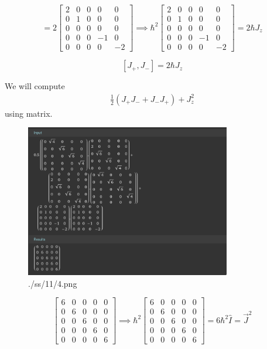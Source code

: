 \documentclass[letter, 10pts]{article}
\newcommand{\hb}{\hbar}
\begin{document}
\[
= 2 
\begin{bmatrix} 2&0&0&0&0\\
0&1&0&0&0\\
0&0&0&0&0\\
0&0&0&-1&0\\
0&0&0&0&-2\end{bmatrix}  
\implies \hb^2
\begin{bmatrix} 2&0&0&0&0\\
0&1&0&0&0\\
0&0&0&0&0\\
0&0&0&-1&0\\
0&0&0&0&-2\end{bmatrix}   = 2 \hb J_z
\] 

\[
	[J_+,J_-] = 2 \hb J_z
\] 

\newpage 
We will compute 
\begin{align*}
	\frac{1}{2}(
	J_+ J_- + J_- J_+ ) + J_z^2
\end{align*}
using matrix. 
\begin{figure}[H]
	\centering
	\includegraphics[width=0.8\textwidth]{./ss/11/4.png}
	\caption{./ss/11/4.png}
	\label{fig:-ss-11-4-png}
\end{figure}
\[
\begin{bmatrix} 
6 & 0 & 0 & 0 & 0 \\
0 & 6 & 0 & 0 & 0 \\
0 & 0 & 6 & 0 & 0 \\
0 & 0 & 0 & 6 & 0 \\
0 & 0 & 0 & 0 & 6
\end{bmatrix}  \implies  \hb^2
\begin{bmatrix}
6 & 0 & 0 & 0 & 0 \\
0 & 6 & 0 & 0 & 0 \\
0 & 0 & 6 & 0 & 0 \\
0 & 0 & 0 & 6 & 0 \\
0 & 0 & 0 & 0 & 6
\end{bmatrix} = 6\hb^2  \hat{I} = \vec{J}^2
\] 
\end{document}
